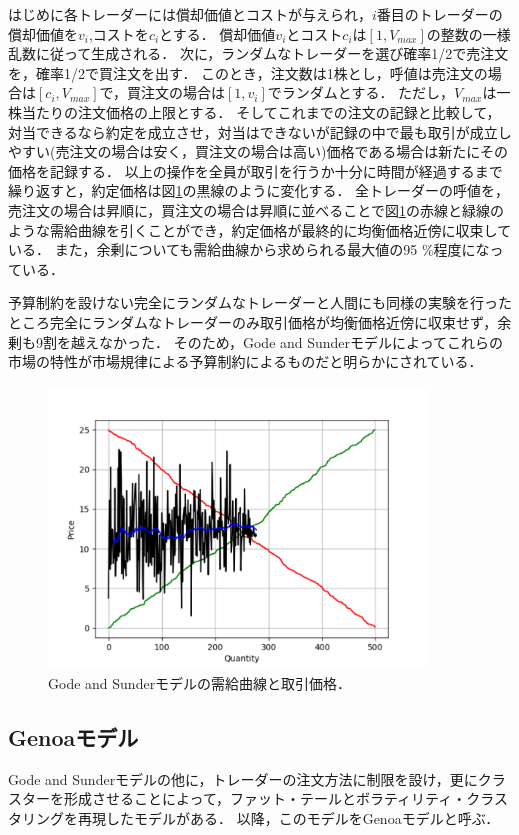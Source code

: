 \documentclass[titlepage]{jsreport}
\begin{document}
はじめに各トレーダーには償却価値とコストが与えられ，$i$番目のトレーダーの償却価値を$v_i$,コストを$c_i$とする．
償却価値$v_i$とコスト$c_i$は$[1, V_{max}]$の整数の一様乱数に従って生成される．
次に，ランダムなトレーダーを選び確率1/2で売注文を，確率1/2で買注文を出す．
このとき，注文数は1株とし，呼値は売注文の場合は$[c_i, V_{max}]$で，買注文の場合は$[1, v_i]$でランダムとする．
ただし，$V_{max}$は一株当たりの注文価格の上限とする．
そしてこれまでの注文の記録と比較して，対当できるなら約定を成立させ，対当はできないが記録の中で最も取引が成立しやすい(売注文の場合は安く，買注文の場合は高い)価格である場合は新たにその価格を記録する．
以上の操作を全員が取引を行うか十分に時間が経過するまで繰り返すと，約定価格は図\ref{fig:gode_sunder_trade}の黒線のように変化する．
全トレーダーの呼値を，売注文の場合は昇順に，買注文の場合は昇順に並べることで図\ref{fig:gode_sunder_trade}の赤線と緑線のような需給曲線を引くことができ，約定価格が最終的に均衡価格近傍に収束している．
また，余剰についても需給曲線から求められる最大値の95 \%程度になっている．

予算制約を設けない完全にランダムなトレーダーと人間にも同様の実験を行ったところ完全にランダムなトレーダーのみ取引価格が均衡価格近傍に収束せず，余剰も9割を越えなかった．
そのため，Gode and Sunderモデルによってこれらの市場の特性が市場規律による予算制約によるものだと明らかにされている．
\begin{figure}[htbp]
    \centering
    \includegraphics[width=10cm]{fig/gode_sunder_trade.pdf}
    \caption{Gode and Sunderモデルの需給曲線と取引価格．}
    \label{fig:gode_sunder_trade}
\end{figure}


\subsection{Genoaモデル}
Gode and Sunderモデルの他に，トレーダーの注文方法に制限を設け，更にクラスターを形成させることによって，ファット・テールとボラティリティ・クラスタリングを再現したモデルがある\cite{Genoa}．
以降，このモデルをGenoaモデルと呼ぶ．
\end{document}
